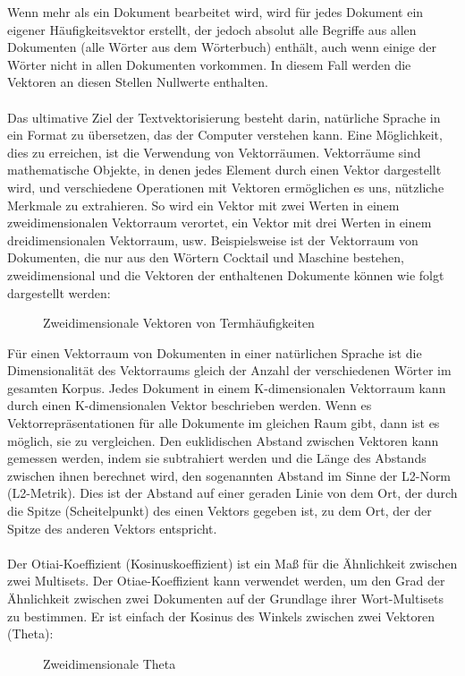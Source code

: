 \noindent
Wenn mehr als ein Dokument bearbeitet wird, wird für jedes Dokument ein eigener Häufigkeitsvektor erstellt, der jedoch absolut alle Begriffe aus allen Dokumenten (alle Wörter aus dem Wörterbuch) enthält, auch wenn einige der Wörter nicht in allen Dokumenten vorkommen. 
In diesem Fall werden die Vektoren an diesen Stellen Nullwerte enthalten.\\\\
Das ultimative Ziel der Textvektorisierung besteht darin, natürliche Sprache in ein Format zu übersetzen, das der Computer verstehen kann. 
Eine Möglichkeit, dies zu erreichen, ist die Verwendung von Vektorräumen. 
Vektorräume sind mathematische Objekte, in denen jedes Element durch einen Vektor dargestellt wird, und verschiedene Operationen mit Vektoren ermöglichen es uns, nützliche Merkmale zu extrahieren. 
So wird ein Vektor mit zwei Werten in einem zweidimensionalen Vektorraum verortet, ein Vektor mit drei Werten in einem dreidimensionalen Vektorraum, usw. 
Beispielsweise ist der Vektorraum von Dokumenten, die nur aus den Wörtern \glqq Cocktail\grqq{} und \glqq Maschine\grqq{} bestehen, zweidimensional und die Vektoren der enthaltenen Dokumente können wie folgt dargestellt werden:
\begin{figure}[H]
    \centering
    \caption{\label{figure:Vraum}Zweidimensionale Vektoren von Termhäufigkeiten}
\end{figure}
\noindent
Für einen Vektorraum von Dokumenten in einer natürlichen Sprache ist die Dimensionalität des Vektorraums gleich der Anzahl der verschiedenen Wörter im gesamten Korpus. 
Jedes Dokument in einem K-dimensionalen Vektorraum kann durch einen K-dimensionalen Vektor beschrieben werden. 
Wenn es Vektorrepräsentationen für alle Dokumente im gleichen Raum gibt, dann ist es möglich, sie zu vergleichen. 
Den euklidischen Abstand zwischen Vektoren kann gemessen werden, indem sie subtrahiert werden und die Länge des Abstands zwischen ihnen berechnet wird, den sogenannten Abstand im Sinne der L2-Norm (L2-Metrik). 
Dies ist der Abstand auf einer geraden Linie von dem Ort, der durch die Spitze (Scheitelpunkt) des einen Vektors gegeben ist, zu dem Ort, der der Spitze des anderen Vektors entspricht.\\\\
Der Otiai-Koeffizient (Kosinuskoeffizient) ist ein Maß für die Ähnlichkeit zwischen zwei Multisets. 
Der Otiae-Koeffizient kann verwendet werden, um den Grad der Ähnlichkeit zwischen zwei Dokumenten auf der Grundlage ihrer Wort-Multisets zu bestimmen. 
Er ist einfach der Kosinus des Winkels zwischen zwei Vektoren (Theta):
\begin{figure}[H]
    \centering
    \caption{\label{figure:Vraum_Theta}Zweidimensionale Theta}
\end{figure}
\noindent
